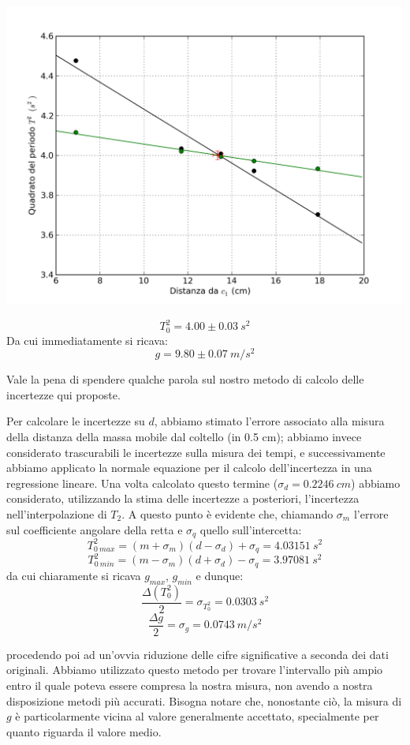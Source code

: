 \begin{center}
\includegraphics[scale=0.70]{../grafici/kater/intersezione.png}
\end{center}

$$T_0^2 = 4.00\pm 0.03\ s^2$$
Da cui immediatamente si ricava:
$$g = 9.80 \pm 0.07\ m/s^2$$

Vale la pena di spendere qualche parola sul nostro metodo di calcolo delle incertezze qui proposte.

Per calcolare le incertezze su $d$, abbiamo stimato l'errore associato alla misura della distanza della massa mobile dal coltello (in 0.5 cm); abbiamo invece considerato trascurabili le incertezze sulla misura dei tempi, e successivamente abbiamo applicato la normale equazione per il calcolo dell'incertezza in una regressione lineare.
Una volta calcolato questo termine ($\sigma_d = 0.2246\ cm$) abbiamo considerato, utilizzando la stima delle incertezze a posteriori, l'incertezza nell'interpolazione di $T_2$. A questo punto è evidente che, chiamando $\sigma_m$ l'errore sul coefficiente angolare della retta e $\sigma_q$ quello sull'intercetta:
$$T^2_{0\ max} = (m+\sigma_m)(d-\sigma_d) + \sigma_q = 4.03151\ s^2$$
$$T^2_{0\ min} = (m-\sigma_m)(d+\sigma_d) - \sigma_q = 3.97081\ s^2$$
da cui chiaramente si ricava $g_{max}$, $g_{min}$ e dunque:
$$\frac{\Delta (T_0^2)}{2} = \sigma_{T_0^2} = 0.0303\ s^2$$
$$\frac{\Delta g}{2} = \sigma_g = 0.0743\ m/s^2 $$

procedendo poi ad un'ovvia riduzione delle cifre significative a seconda dei dati originali. Abbiamo utilizzato questo metodo per trovare l'intervallo più ampio entro il quale poteva essere compresa la nostra misura, non avendo a nostra disposizione metodi più accurati. Bisogna notare che, nonostante ciò, la misura di $g$ è particolarmente vicina al valore generalmente accettato, specialmente per quanto riguarda il valore medio.

